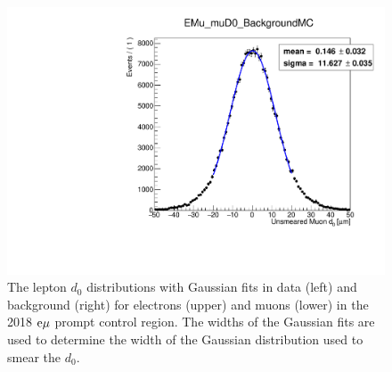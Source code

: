 \begin{figure}[hbtp]
\includegraphics[scale=0.3]{figures/corrections/d0_smearing/emu_2018/gaussian_fit_EMu_muD0_BackgroundMC.pdf}
\caption{The lepton $d_0$ distributions with Gaussian fits in data (left) and background (right) for electrons (upper) and muons (lower) in the 2018 $\mathrm{e}{\mu}$ prompt control region. The widths of the Gaussian fits are used to determine the width of the Gaussian distribution used to smear the $d_0$.}
\label{gaussian_fits_2018}
\end{figure}